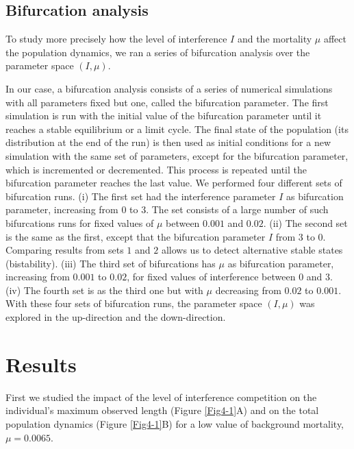 \subsection{Bifurcation analysis}

To study more precisely how the level of interference $I$ and the mortality
$\mu$ affect the population dynamics, we ran a series of bifurcation analysis
over the parameter space $(I,\mu)$.

In our case, a bifurcation analysis consists of a series of numerical
simulations with all parameters fixed but one, called the bifurcation parameter.
The first simulation is run with the initial value of the bifurcation parameter
until it reaches a stable equilibrium or a limit cycle. The final state of the
population (its distribution at the end of the run) is then used as initial
conditions for a new simulation with the same set of parameters, except for the
bifurcation parameter, which is incremented or decremented. This process is
repeated until the bifurcation parameter reaches the last value. We performed
four different sets of bifurcation runs. (i) The first set had the interference
parameter $I$ as bifurcation parameter, increasing from $0$ to $3$. The set
consists of a large number of such bifurcations runs for fixed values of $\mu$
between $0.001$ and $0.02$. (ii) The second set is the same as the first, except
that the bifurcation parameter $I$ from $3$ to $0$. Comparing results from sets
$1$ and $2$ allows us to detect alternative stable states (bistability). (iii)
The third set of bifurcations has $\mu$ as bifurcation parameter, increasing
from $0.001$ to $0.02$, for fixed values of interference between $0$ and $3$.
(iv) The fourth set is as the third one but with $\mu$ decreasing from $0.02$ to
$0.001$.  With these four sets of bifurcation runs, the parameter space
$(I,\mu)$ was explored in the up-direction and the down-direction.

\section{Results}

First we studied the impact of the level of interference competition on the
individual's maximum observed length (Figure \ref{Fig4-1}A) and on the total population
dynamics (Figure \ref{Fig4-1}B) for a low value of background mortality,
$\mu=0.0065$.


